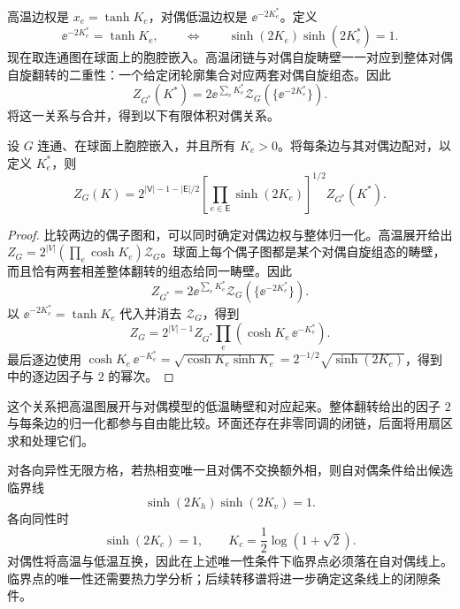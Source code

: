 高温边权是 \(x_e=\tanh K_e\)，对偶低温边权是 \(\ee^{-2K_e^*}\)。定义
\begin{equation}
 \ee^{-2K_e^*}=\tanh K_e,
 \qquad\Longleftrightarrow\qquad
 \sinh(2K_e)\sinh(2K_e^*)=1.
 \label{eq:phys-sm-dual-coupling}
\end{equation}
现在取连通图在球面上的胞腔嵌入。高温闭链与对偶自旋畴壁一一对应到整体对偶自旋翻转的二重性：一个给定闭轮廓集合对应两套对偶自旋组态。因此
\[
 Z_{G^*}(K^*)
 =2\ee^{\sum_eK_e^*}
 \mathcal Z_G(\{\ee^{-2K_e^*}\}).
\]
将这一关系与合并，得到以下有限体积对偶关系。
\begin{proposition}[球面嵌入图的有限体积对偶]
设 $G$ 连通、在球面上胞腔嵌入，并且所有 $K_e>0$。将每条边与其对偶边配对，以定义 $K_e^*$，则
\begin{equation}
 Z_G(K)
 =2^{|\mathsf V|-1-|\mathsf E|/2}
 \left[\prod_{e\in\mathsf E}\sinh(2K_e)\right]^{1/2}
 Z_{G^*}(K^*).
 \label{eq:phys-sm-kw-finite-sphere}
\end{equation}
\end{proposition}

\begin{proof}
比较两边的偶子图和，可以同时确定对偶边权与整体归一化。高温展开给出 \(Z_G=2^{|V|}(\prod_e\cosh K_e)\mathcal Z_G\)。球面上每个偶子图都是某个对偶自旋组态的畴壁，而且恰有两套相差整体翻转的组态给同一畴壁。因此
\[
Z_{G^*}=2\ee^{\sum_eK_e^*}\mathcal Z_G(\{\ee^{-2K_e^*}\}).
\]
以 \(\ee^{-2K_e^*}=\tanh K_e\) 代入并消去 \(\mathcal Z_G\)，得到
\[
Z_G=2^{|V|-1}Z_{G^*}\prod_e(\cosh K_e\,\ee^{-K_e^*}).
\]
最后逐边使用
\(\cosh K_e\,\ee^{-K_e^*}
=\sqrt{\cosh K_e\sinh K_e}
=2^{-1/2}\sqrt{\sinh(2K_e)}\)，得到中的逐边因子与 $2$ 的幂次。
\end{proof}

这个关系把高温图展开与对偶模型的低温畴壁和对应起来。整体翻转给出的因子 $2$ 与每条边的归一化都参与自由能比较。环面还存在非零同调的闭链，后面将用扇区求和处理它们。

对各向异性无限方格，若热相变唯一且对偶不交换额外相，则自对偶条件给出候选临界线
\begin{equation}
  \sinh(2K_h)\sinh(2K_v)=1.
  \label{eq:phys-sm-critical-line-duality}
\end{equation}
各向同性时
\begin{equation}
  \sinh(2K_c)=1,
  \qquad
  K_c=\frac12\log(1+\sqrt2).
  \label{eq:phys-sm-square-critical-k}
\end{equation}
对偶性将高温与低温互换，因此在上述唯一性条件下临界点必须落在自对偶线上。临界点的唯一性还需要热力学分析；后续转移谱将进一步确定这条线上的闭隙条件。

